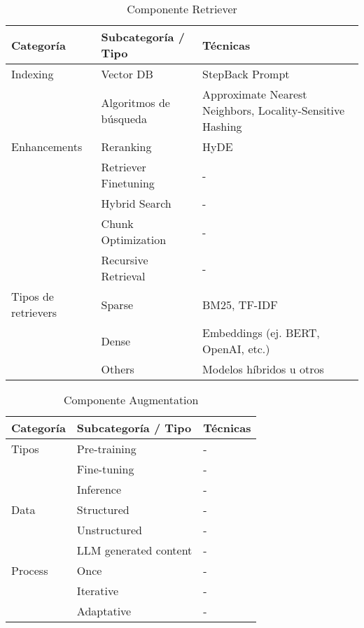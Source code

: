 \begin{table}[H]
\centering
\begin{tabularx}{\textwidth}{|l|l|X|}
\hline
\textbf{Categoría} & \textbf{Subcategoría / Tipo} & \textbf{Técnicas} \\ \hline
Indexing & Vector DB & StepBack Prompt \\ \hline
         & Algoritmos de búsqueda & Approximate Nearest Neighbors, Locality-Sensitive Hashing \\ \hline
Enhancements & Reranking & HyDE \\ \hline
             & Retriever Finetuning & - \\ \hline
             & Hybrid Search & - \\ \hline
             & Chunk Optimization & - \\ \hline
             & Recursive Retrieval & - \\ \hline
Tipos de retrievers & Sparse & BM25, TF-IDF \\ \hline
                    & Dense & Embeddings (ej. BERT, OpenAI, etc.) \\ \hline
                    & Others & Modelos híbridos u otros \\ \hline
\end{tabularx}
\caption{Componente Retriever}
\end{table}



\begin{table}[H]
\centering

\begin{tabularx}{\textwidth}{|l|l|>{\raggedright\arraybackslash}X|}
\hline
\textbf{Categoría} & \textbf{Subcategoría / Tipo} & \textbf{Técnicas} \\ \hline
Tipos   & Pre-training  & - \\ \hline
        & Fine-tuning   & - \\ \hline
        & Inference     & - \\ \hline
Data    & Structured    & - \\ \hline
        & Unstructured  & - \\ \hline
        & LLM generated content & - \\ \hline
Process & Once          & - \\ \hline
        & Iterative     & - \\ \hline
        & Adaptative    & - \\ \hline
\end{tabularx}
\caption{Componente Augmentation}
\end{table}

